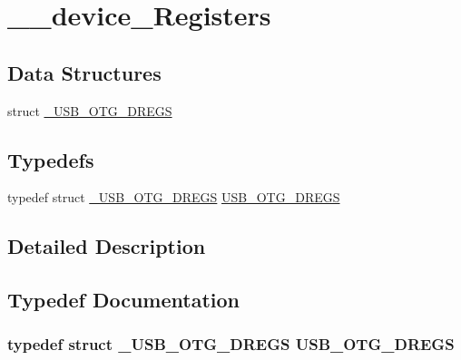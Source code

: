 \hypertarget{group______device___registers}{\section{\-\_\-\-\_\-device\-\_\-\-Registers}
\label{group______device___registers}
}
\subsection*{Data Structures}
\begin{DoxyCompactItemize}
\item 
struct \hyperlink{struct___u_s_b___o_t_g___d_r_e_g_s}{\-\_\-\-U\-S\-B\-\_\-\-O\-T\-G\-\_\-\-D\-R\-E\-G\-S}
\end{DoxyCompactItemize}
\subsection*{Typedefs}
\begin{DoxyCompactItemize}
\item 
typedef struct \hyperlink{struct___u_s_b___o_t_g___d_r_e_g_s}{\-\_\-\-U\-S\-B\-\_\-\-O\-T\-G\-\_\-\-D\-R\-E\-G\-S} \hyperlink{group______device___registers_gad6421c23a43e84eb179f543a1cd3c04c}{U\-S\-B\-\_\-\-O\-T\-G\-\_\-\-D\-R\-E\-G\-S}
\end{DoxyCompactItemize}


\subsection{Detailed Description}


\subsection{Typedef Documentation}
\hypertarget{group______device___registers_gad6421c23a43e84eb179f543a1cd3c04c}{
\subsubsection[{U\-S\-B\-\_\-\-O\-T\-G\-\_\-\-D\-R\-E\-G\-S}]{\setlength{\rightskip}{0pt plus 5cm}typedef struct {\bf \-\_\-\-U\-S\-B\-\_\-\-O\-T\-G\-\_\-\-D\-R\-E\-G\-S}
 {\bf U\-S\-B\-\_\-\-O\-T\-G\-\_\-\-D\-R\-E\-G\-S}}}\label{group______device___registers_gad6421c23a43e84eb179f543a1cd3c04c}
